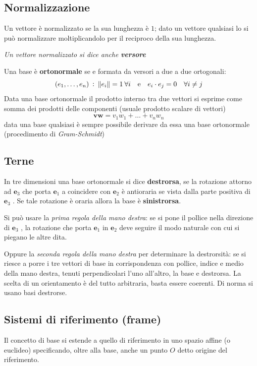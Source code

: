 \documentclass[a4paper, 10pt]{article}
\renewcommand{\vec}{\bm}
\begin{document}
		\subsection{Normalizzazione}
			Un vettore è normalizzato se la sua lunghezza è $ 1 $; dato un
			vettore qualsiasi lo si può normalizzare moltiplicandolo per il
			reciproco della sua lunghezza.
			
			\noindent
			\textit{Un vettore normalizzato si dice anche \textbf{versore}}
			
			Una base è \textbf{ortonormale} se e formata da versori a due a due
			ortogonali:
			\[
				(e_1, \dots, e_n) \: : \: \lVert e_i \rVert = 1 \: \forall i \quad \textup{e}
				\quad e_i\cdot e_j = 0 \quad \forall i \neq j
			\]
			Data una base ortonormale il prodotto interno tra due vettori
			si esprime come somma dei prodotti delle componenti (usuale
			prodotto scalare di vettori)
			\[
				\vec{v} \vec{w} = v_1 w_1 + \dots + v_n w_n
			\]
			data una base qualsiasi è sempre possibile derivare da essa una base
			ortonormale (procedimento di \textit{Gram-Schmidt})
			
		\subsection{Terne}
			In tre dimensioni una base ortonormale si dice \textbf{destrorsa}, se la
			rotazione attorno ad $ \vec{e}_3 $ che porta $ \vec{e}_1 $ a coincidere con $ \vec{e}_2 $ è
			antioraria se vista dalla parte positiva di $ \vec{e}_3 $ .
			Se tale rotazione è oraria allora la base è \textbf{sinistrorsa}.
			
			\noindent
			Si può usare la \textit{prima regola della mano destra}: se si pone il
			pollice nella direzione di $ \vec{e}_3 $ , la rotazione che porta $ \vec{e}_1 $ in $ \vec{e}_2 $ deve seguire il modo naturale con cui si piegano le altre dita.
			
			\noindent
			Oppure la \textit{seconda regola della mano destra} per determinare la
			destrorsità: se si riesce a porre i tre vettori di base in
			corrispondenza con pollice, indice e medio della mano destra,
			tenuti perpendicolari l'uno all'altro, la base e destrorsa.
			La scelta di un orientamento è del tutto arbitraria, basta
			essere coerenti. Di norma si usano basi destrorse.
			
		\subsection{Sistemi di riferimento (frame)}
			Il concetto di base si estende a quello di riferimento in uno
			spazio affine (o euclideo) specificando, oltre alla base, anche
			un punto $ O $ detto origine del riferimento.
			
\end{document}
